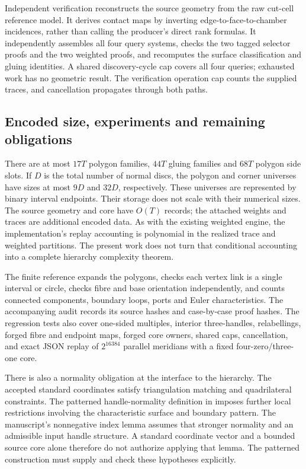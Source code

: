 Independent verification reconstructs the source geometry from the raw
cut-cell reference model. It derives contact maps by inverting
edge-to-face-to-chamber incidences, rather than calling the producer's direct
rank formulas. It independently assembles all four query systems, checks the
two tagged selector proofs and the two weighted proofs, and recomputes the
surface classification and gluing identities. A shared discovery-cycle cap
covers all four queries; exhausted work has no geometric result. The
verification operation cap counts the supplied traces, and cancellation
propagates through both paths.

\subsection{Encoded size, experiments and remaining obligations}

There are at most $17T$ polygon families, $44T$ gluing families and $68T$
polygon side slots. If $D$ is the total number of normal discs, the polygon
and corner universes have sizes at most $9D$ and $32D$, respectively. These
universes are represented by binary interval endpoints. Their storage does
not scale with their numerical sizes. The source geometry and core have
$O(T)$ records; the attached weights and traces are additional encoded data.
As with the existing weighted engine, the implementation's replay accounting
is polynomial in the realized trace and weighted partitions. The present
work does not turn that conditional accounting into a complete hierarchy
complexity theorem.

The finite reference expands the polygons, checks each vertex link is a
single interval or circle, checks fibre and base orientation independently,
and counts connected components, boundary loops, ports and Euler
characteristics. The accompanying audit records its source hashes and
case-by-case proof hashes. The regression tests also cover one-sided
multiples, interior three-handles, relabellings, forged fibre and endpoint
maps, forged core owners, shared caps, cancellation, and exact JSON replay
of $2^{16384}$ parallel meridians with a fixed four-zero/three-one core.



There is also a normality obligation at the interface to the hierarchy.
The accepted standard coordinates satisfy triangulation matching and
quadrilateral constraints. The patterned handle-normality definition in
\cite{lackenby2026} imposes further local restrictions involving the
characteristic surface and boundary pattern. The manuscript's nonnegative
index lemma assumes that stronger normality and an admissible input handle
structure. A standard coordinate vector and a bounded source core alone
therefore do not authorize applying that lemma. The patterned construction
must supply and check these hypotheses explicitly.

